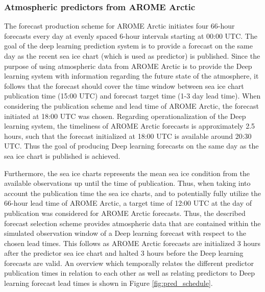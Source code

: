 \documentclass[../main/thesis]{subfiles}
\begin{document}
\subsubsection{Atmospheric predictors from AROME Arctic}
\label{sec:data_arome}
The forecast production scheme for AROME Arctic initiates four 66-hour forecasts every day at evenly spaced 6-hour intervals starting at 00:00 UTC. The goal of the deep learning prediction system is to provide a forecast on the same day as the recent sea ice chart (which is used as predictor) is published. Since the purpose of using atmospheric data from AROME Arctic is to provide the Deep learning system with information regarding the future state of the atmosphere, it follows that the forecast should cover the time window between sea ice chart publication time (15:00 UTC) and forecast target time (1-3 day lead time). When considering the publication scheme and lead time of AROME Arctic, the forecast initiated at 18:00 UTC was chosen. Regarding operationalization of the Deep learning system, the timeliness of AROME Arctic forecasts is approximately 2.5 hours, such that the forecast initialized at 18:00 UTC is available around 20:30 UTC. Thus the goal of producing Deep learning forecasts on the same day as the sea ice chart is published is achieved.

Furthermore, the sea ice charts represents the mean sea ice condition from the available observations up until the time of publication. Thus, when taking into account the publication time the sea ice charts, and to potentially fully utilize the 66-hour lead time of AROME Arctic, a target time of 12:00 UTC at the day of publication was considered for AROME Arctic forecasts. Thus, the described forecast selection scheme provides atmospheric data that are contained within the simulated observation window of a Deep learning forecast with respect to the chosen lead times. This follows as AROME Arctic forecasts are initialized 3 hours after the predictor sea ice chart and halted 3 hours before the Deep learning forecasts are valid. An overview which temporally relates the different predictor publication times in relation to each other as well as relating predictors to Deep learning forecast lead times is shown in Figure \ref{fig:pred_schedule}.
\end{document}
